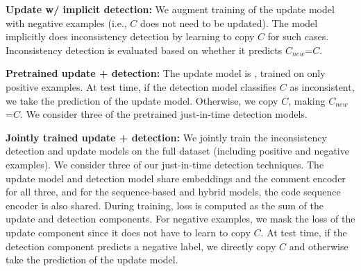 \documentclass[letterpaper]{article} %
\newcommand{\Comment}{$C$}
\newcommand{\NewComment}{$C_{new}$}
\newcommand{\JustInTime}{just-in-time}
\newcommand{\UpdateCopy}{Update w/ implicit detection}
\newcommand{\Pretrained}{Pretrained update + detection}
\newcommand{\JointlyTrained}{Jointly trained update + detection}
\begin{document}
\noindent\textbf{\UpdateCopy{}:} We augment training of the update model with negative examples (i.e., \Comment{} does not need to be updated).
The model implicitly does inconsistency detection by learning to copy \Comment{} for such cases. Inconsistency detection is evaluated based on whether it predicts \NewComment{}=\Comment{}.

\noindent\textbf{\Pretrained{}:} The update model is \citet{panthaplackel2020update}, trained on only positive examples. At test time, if the detection model classifies \Comment{} as inconsistent, we take the prediction of the update model. Otherwise, we copy \Comment{}, making \NewComment{}=\Comment{}. We consider three of the pretrained \JustInTime{} detection models.

\noindent\textbf{\JointlyTrained{}:} We jointly train the inconsistency detection and update models on the full dataset (including positive and negative examples). We consider three of our \JustInTime{} detection techniques. The update model and detection model share embeddings and the comment encoder for all three, and for the sequence-based and hybrid models, the code sequence encoder is also shared. During training, loss is computed as the sum of the update and detection components. For negative examples, we mask the loss of the update component since it does not have to learn to copy \Comment{}. At test time, if the detection component predicts a negative label, we directly copy \Comment{} and otherwise take the prediction of the update model.
\end{document}
